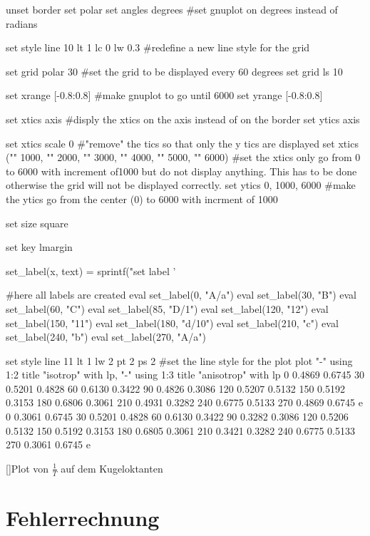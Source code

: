 \documentclass[12pt,a4paper,]{scrreprt}
\begin{document}
 				\begin{gnuplot}[terminal=pdf,terminaloptions={font ",10" linewidth 3},scale=1.2]      
   				unset border
set polar
set angles degrees #set gnuplot on degrees instead of radians

set style line 10 lt 1 lc 0 lw 0.3 #redefine a new line style for the grid

set grid polar 30 #set the grid to be displayed every 60 degrees
set grid ls 10

set xrange [-0.8:0.8] #make gnuplot to go until 6000
set yrange [-0.8:0.8]

set xtics axis #disply the xtics on the axis instead of on the border
set ytics axis

set xtics scale 0 #"remove" the tics so that only the y tics are displayed
set xtics ("" 1000, "" 2000, "" 3000, "" 4000, "" 5000, "" 6000) #set the xtics only go from 0 to 6000 with increment of1000 but do not display anything. This has to be done otherwise the grid will not be displayed correctly.
set ytics 0, 1000, 6000 #make the ytics go from the center (0) to 6000 with incrment of 1000

set size square 

set key lmargin

set_label(x, text) = sprintf("set label '%

#here all labels are created
eval set_label(0, "A/a")
eval set_label(30, "B")
eval set_label(60, "C")
eval set_label(85, "D/1")
eval set_label(120, "12")
eval set_label(150, "11")
eval set_label(180, "d/10")
eval set_label(210, "c")
eval set_label(240, "b")
eval set_label(270, "A/a")

set style line 11 lt 1 lw 2 pt 2 ps 2 #set the line style for the plot
plot "-" using 1:2 title "isotrop" with lp, "-" using 1:3 title "anisotrop" with lp
0	0.4869	0.6745
30	0.5201	0.4828
60	0.6130	0.3422
90	0.4826	0.3086
120	0.5207	0.5132
150	0.5192	0.3153
180	0.6806	0.3061
210	0.4931	0.3282
240	0.6775	0.5133
270	0.4869	0.6745
e
0	0.3061	0.6745
30	0.5201	0.4828
60	0.6130	0.3422
90	0.3282	0.3086
120	0.5206	0.5132
150	0.5192	0.3153
180	0.6805	0.3061
210	0.3421	0.3282
240	0.6775	0.5133
270	0.3061	0.6745
e
\end{gnuplot}
    []{Plot von $\frac{1}{T}$ auf dem Kugeloktanten}
           \chapter{Fehlerrechnung}
\end{document}
